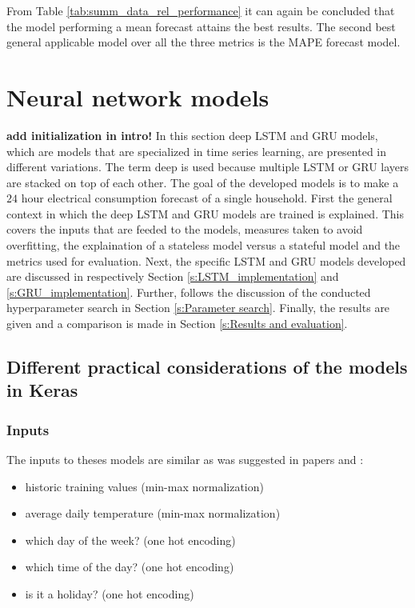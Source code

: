 From Table \ref{tab:summ_data_rel_performance} it can again be concluded that the model performing a mean forecast attains the best results. The second best general applicable model over all the three metrics is the MAPE forecast model.


\section{Neural network models}\label{s:Neural network models}
\textbf{add initialization in intro!}
In this section deep LSTM and GRU models, which are models that are specialized in time series learning, are presented in different variations. The term deep is used because multiple LSTM or GRU layers are stacked on top of each other. The goal of the developed models is to make a $ 24 $ hour electrical consumption forecast of a single household. First the general context in which the deep LSTM and GRU models are trained is explained. This covers the inputs that are feeded to the models, measures taken to avoid overfitting, the explaination of a stateless model versus a stateful model and the metrics used for evaluation. Next, the specific LSTM and GRU models developed are discussed in respectively Section \ref{s:LSTM_implementation} and \ref{s:GRU_implementation}. Further, follows  the discussion of the conducted hyperparameter search in Section \ref{s:Parameter search}. Finally, the results are given and a comparison is made in Section \ref{s:Results and evaluation}.

\subsection{Different practical considerations of the models in Keras}

\subsubsection{Inputs}\label{s:Inputs}
The inputs to theses models are similar as was suggested in papers \cite{loadforecastingmoor} and \cite{Kong2019}: 
\begin{itemize}
	\item historic training values (min-max normalization)
	\item average daily temperature (min-max normalization)
	\item which day of the week? (one hot encoding)
	\item which time of the day? (one hot encoding)
	\item is it a holiday? (one hot encoding)
\end{itemize}

